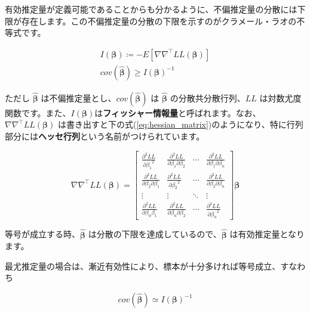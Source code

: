 有効推定量が定義可能であることからも分かるように、不偏推定量の分散には下限が存在します。この不偏推定量の分散の下限を示すのがクラメール・ラオの不等式です。

\begin{theorem}
    \begin{align}
        I(\bm\beta) \coloneqq -E\left[\nabla\nabla^\top LL(\bm\beta)\right] \\
        cov(\bm{\hat\beta}) \ge I(\bm\beta)^{-1}
    \end{align}
\end{theorem}

ただし $\bm{\hat\beta}$ は不偏推定量とし、$cov(\bm{\hat\beta})$ は $\bm{\hat\beta}$ の分散共分散行列、$LL$ は対数尤度関数です。また、$I(\bm\beta)$は\textbf{フィッシャー情報量}と呼ばれます。なお、$\nabla\nabla^\top LL(\bm\beta)$ は書き出すと下の式(\ref{eq:hessian_matrix})のようになり、特に行列部分には\textbf{ヘッセ行列}という名前がつけられています。

\begin{equation}
    \label{eq:hessian_matrix}
    \nabla\nabla^\top LL(\bm\beta) = \begin{bmatrix}
        \frac{\partial^2 LL}{\partial {\beta_1}^2}              & \frac{\partial^2 LL}{\partial \beta_1 \partial \beta_2} & \cdots & \frac{\partial^2 LL}{\partial \beta_1 \partial \beta_n}  \\
        \frac{\partial^2 LL}{\partial \beta_2 \partial \beta_1} & \frac{\partial^2 LL}{\partial {\beta_2}^2}              & \cdots & \frac{\partial^2 LL}{\partial \beta_2 \partial \beta_n } \\
        \vdots                                                  & \vdots                                                  & \ddots & \vdots                                                   \\
        \frac{\partial^2 LL}{\partial \beta_n \beta_1}          & \frac{\partial^2 LL}{\partial \beta_n \partial \beta_2} & \cdots & \frac{\partial^2 LL}{\partial {\beta_n}^2}
    \end{bmatrix} \bm\beta
\end{equation}

等号が成立する時、$\bm{\hat\beta}$ は分散の下限を達成しているので、$\bm{\hat\beta}$ は有効推定量となります。

最尤推定量の場合は、漸近有効性により、標本が十分多ければ等号成立、すなわち

\begin{equation}
    \label{eq:fisher_information_inv}
    cov(\bm{\hat\beta}) \simeq I(\bm\beta)^{-1}
\end{equation}

